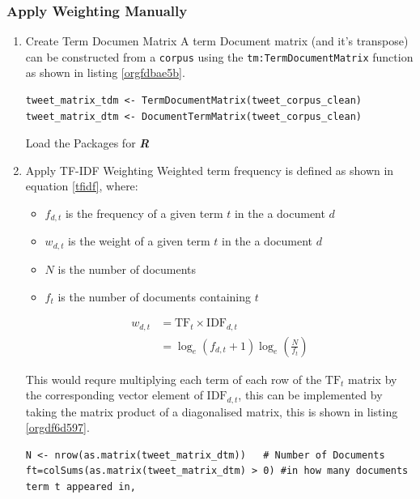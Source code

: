 \documentclass[11pt]{article}
\begin{document}
\subsubsection{Apply Weighting Manually}
\label{sec:orgdeb087f}
\begin{enumerate}
\item Create Term Documen Matrix
\label{sec:org767c443}
A term Document matrix (and it's transpose) can be constructed from a \texttt{corpus} using the
\texttt{tm:TermDocumentMatrix} function as shown in listing \ref{orgfdbae5b}.

\begin{listing}[htbp]
\begin{verbatim}
tweet_matrix_tdm <- TermDocumentMatrix(tweet_corpus_clean)
tweet_matrix_dtm <- DocumentTermMatrix(tweet_corpus_clean)
\end{verbatim}
\caption{\label{orgfdbae5b}Load the Packages for \textbf{\textbf{\emph{R}}}}
\end{listing}

\item Apply TF-IDF Weighting
\label{sec:org778efc8}
Weighted term frequency is defined as shown in equation \eqref{tfidf}, where:

\begin{itemize}
\item \(f_{d,t}\) is the frequency of a given term \(t\) in the a document \(d\)
\item \(w_{d,t}\) is the weight of a given term \(t\) in the a document \(d\)
\item \(N\) is the number of documents
\item \(f_{t}\) is the number of documents containing \(t\)
\end{itemize}

\begin{equation}\begin{aligned}
w_{d, t} &=\mathrm{TF}_{t} \times \mathrm{IDF}_{d, t} \\
&=\log _{e}\left(f_{d, t}+1\right) \log _{e}\left(\frac{N}{f_{t}}\right) \label{tfidf}
\end{aligned}\end{equation}

This would requre multiplying each term of each row of the \(\mathrm{TF}_{t}\) matrix by the corresponding vector element of \(\mathrm{IDF}_{d,t}\), this can be implemented by taking the matrix product of a diagonalised matrix, this is shown in listing \ref{orgdf6d597}.

\begin{listing}[htbp]
\begin{verbatim}
N <- nrow(as.matrix(tweet_matrix_dtm))   # Number of Documents
ft=colSums(as.matrix(tweet_matrix_dtm) > 0) #in how many documents term t appeared in,


\end{verbatim}
\end{listing}
\end{enumerate}
\end{document}

